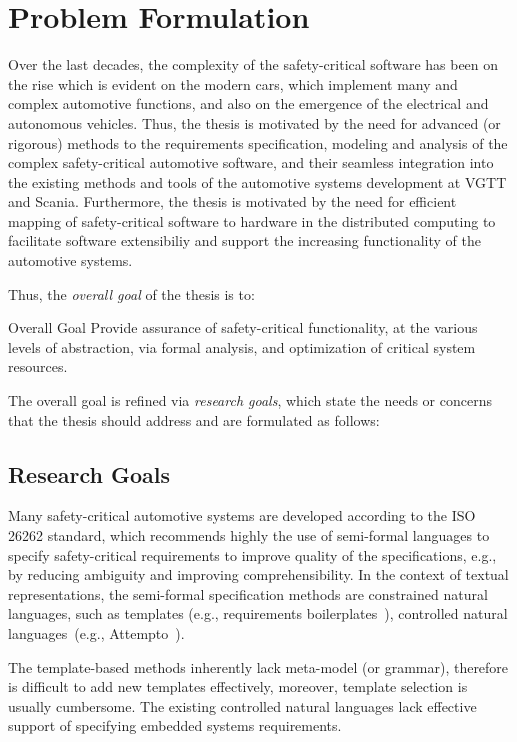 \chapter{Problem Formulation}
Over the last decades, the complexity of the safety-critical software has been on the rise which is evident on the modern cars, which implement many and complex automotive functions, and also on the emergence of the electrical and autonomous vehicles. Thus, the thesis is motivated by the need for advanced (or rigorous) methods to the requirements specification, modeling and analysis of the complex safety-critical automotive software, and their seamless integration into the existing methods and tools of the automotive systems development at VGTT and Scania. Furthermore, the thesis is motivated by the need for efficient mapping of safety-critical software to hardware in the distributed computing to facilitate software extensibiliy and support the increasing functionality of the automotive systems. 

Thus, the \textit{overall goal} of the thesis is to:
\begin{mybox}[attach title to upper={\ ---\ }]{Overall Goal}
	Provide assurance of safety-critical functionality, at the various levels of abstraction, via formal analysis, and optimization of critical system resources.
\end{mybox}

The overall goal is refined via \textit{research goals}, which state the needs or concerns that the thesis should address and are formulated as follows:

\section{Research Goals}\label{research_challenges}
Many safety-critical automotive systems are developed according to the ISO 26262 standard, which recommends highly the use of semi-formal languages to specify safety-critical requirements to improve quality of the specifications, e.g., by reducing ambiguity and improving comprehensibility. In the context of textual representations, the semi-formal specification methods are constrained natural languages, such as templates (e.g., requirements boilerplates~\cite{Farfeleder2011DODT:Development}\cite{Mahmud2015ReSA:Systems}), controlled natural languages~\cite{Kuhn2014ALanguages}(e.g., Attempto~\cite{attempto96}).

The template-based methods inherently lack meta-model (or grammar), therefore is difficult to add new templates effectively, moreover, template selection is usually cumbersome. The existing controlled natural languages lack effective support of specifying embedded systems requirements.

